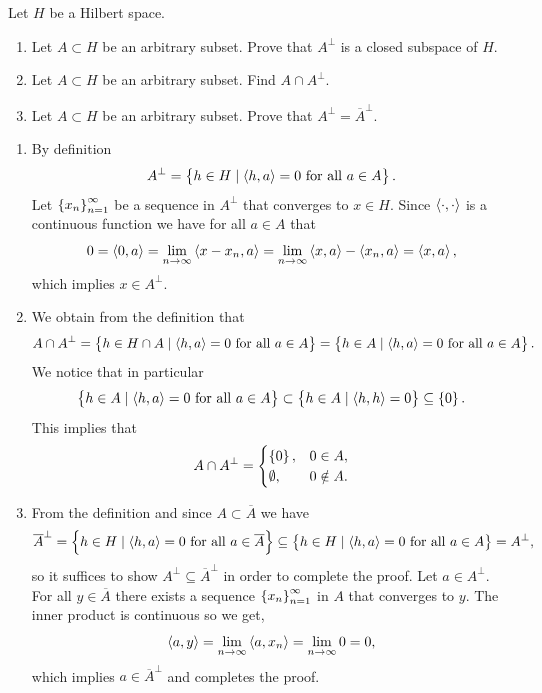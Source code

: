 \documentclass[11pt,a4paper]{article}
\begin{document}
\begin{exercise}
  Let $H$ be a Hilbert space.
  \begin{enumerate}
    \item[(1)] Let $A \subset H$ be an arbitrary subset.
      Prove that $A^{\perp}$ is a closed subspace of $H$.
    \item[(2)] Let $A \subset H$ be an arbitrary subset.
      Find $A \cap A^{\perp}$.
    \item[(3)] Let $A \subset H$ be an arbitrary subset.
      Prove that $A^{\perp} = \overline A^{\perp}$.
  \end{enumerate}
\end{exercise}
\begin{solution} \phantom{}
  \begin{enumerate}
    \item[(1)] By definition
      \[
        A^{\perp} = \left\{h \in H \mid \left\langle h, a \right\rangle = 0 \text{ for all } a \in A\right\}.
      \]
      Let $\left\{x_n\right\}_{n=1}^{\infty}$ be a sequence in $A^{\perp}$
      that converges to $x \in H$.
      Since $\left\langle \cdot, \cdot \right\rangle$ is a continuous function we have
      for all $a \in A$ that
      \[
        0 =
        \left\langle 0, a \right\rangle =
        \lim_{n \to \infty} \left\langle x - x_n, a \right\rangle =
        \lim_{n \to \infty} \left\langle x, a \right\rangle - \left\langle x_n, a \right\rangle =
        \left\langle x, a \right\rangle,
      \]
      which implies $x \in A^{\perp}$.
    \item[(2)] We obtain from the definition that
      \[
        A \cap A^{\perp} =
        \left\{h \in H \cap A \mid \left\langle h, a \right\rangle = 0 \text{ for all } a \in A\right\} =
        \left\{h \in A \mid \left\langle h, a \right\rangle = 0 \text{ for all } a \in A\right\}.
      \]
      We notice that in particular
      \[
        \left\{h \in A \mid \left\langle h, a \right\rangle = 0 \text{ for all } a \in A\right\} \subset
        \left\{h \in A \mid \left\langle h, h \right\rangle = 0\right\} \subseteq \left\{0\right\}.
      \]
      This implies that
      \[
        A \cap A^{\perp} =
        \begin{cases}
          \left\{0\right\}, &0 \in A, \\
          \emptyset, &0 \notin A.
        \end{cases}
      \]
    \item[(3)] From the definition and since $A \subset \overline A$ we have
      \[
        \overline A^{\perp} =
        \left\{h \in H \mid \left\langle h, a \right\rangle = 0 \text{ for all } a \in \overline A\right\}
        \subseteq
        \left\{h \in H \mid \left\langle h, a \right\rangle = 0 \text{ for all } a \in A\right\} = A^{\perp},
      \]
      so it suffices to show $A^{\perp} \subseteq \overline A^{\perp}$
      in order to complete the proof.
      Let $a \in A^{\perp}$.
      For all $y \in \overline A$ there exists a sequence
      $\left\{x_n\right\}_{n=1}^{\infty}$ in $A$ that converges to $y$.
      The inner product is continuous so we get,
      \[
        \left\langle a, y \right\rangle =
        \lim_{n \to \infty} \left\langle a, x_n \right\rangle =
        \lim_{n \to \infty} 0 = 0,
      \]
      which implies $a \in \overline A^{\perp}$ and completes the proof.
  \end{enumerate}
\end{solution}
\end{document}
